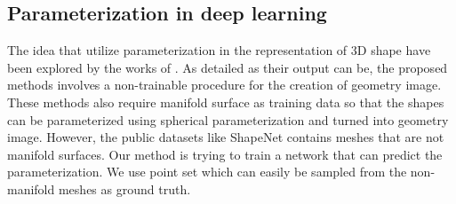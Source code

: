 \subsection{Parameterization in deep learning}
 The idea that utilize parameterization in the representation of 3D shape have been explored by the works of \cite{surfnet}\cite{geoimg}. As detailed as their output can be, the proposed methods involves a non-trainable procedure for the creation of geometry image. These methods also require manifold surface as training data so that the shapes can be parameterized using spherical parameterization and turned into geometry image. However, the public datasets like ShapeNet\cite{shapenetdata} contains meshes that are not manifold surfaces. Our method is trying to train a network that can predict the parameterization. We use point set which can easily be sampled from the non-manifold meshes as ground truth. 
